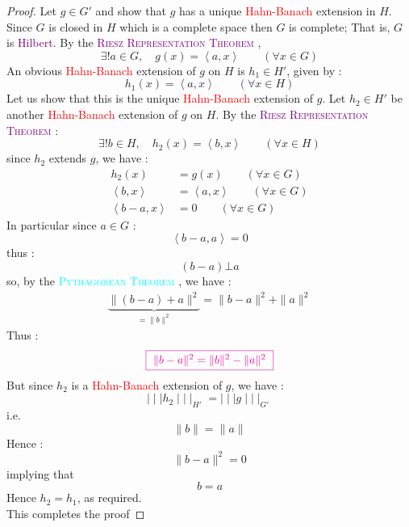 \begin{proof}
  Let $g \in  G'$ and show that $g $ has
  a unique \textcolor{red}{Hahn-Banach} extension in $H $.  
  Since $G$ is closed in $H $ which is a complete space  
  then $G $ is complete; That is, $G $ is \textcolor{purple}{Hilbert}.
  By the 
  \textcolor{purple}{
    \textsc{
  Riesz Representation Theorem 
    }
  }, 
  \[
  \exists ! a \in  G, \quad 
  g(x)  = \left\langle a,x \right\rangle   
  \quad \quad \left( \forall  x \in  G \right)
  \]
  An obvious \textcolor{red}{Hahn-Banach} extension of $g $ 
  on $H $ is $h_1 \in  H'$, given by :  
  \[
  h_1(x) = \left\langle 
    a, x
  \right\rangle   \quad \quad 
  \left( \forall  x \in  H \right)
  \]
  Let us show that this is the unique 
  \textcolor{red}{Hahn-Banach} extension of $g$. 
  Let $h_2 \in  H' $ be another \textcolor{red}{Hahn-Banach} 
  extension of $g $ on $H$. By the 
  \textcolor{purple}{
    \textsc{
  Riesz Representation Theorem 
    }
  } : 
  \[
  \exists ! b \in  H, \quad 
  h_2(x) = \left\langle 
    b,x
  \right\rangle \quad \quad (\forall  x \in  H) 
  \]
  since $h_2 $ extends $g $, we have :
  \begin{align*}
    h_2(x)  &= g(x)  \quad \quad (\forall  x \in  G)  
    \\
    \left\langle b,x \right\rangle  &=
    \left\langle a,x \right\rangle   \quad \quad 
    \left( \forall  x \in  G \right) 
    \\
    \left\langle b-a, x \right\rangle  &= 0  \quad \quad 
    \left( 
      \forall  x \in  G
    \right)
  \end{align*}
  In particular since $a \in G $ :  
  \[
  \left\langle 
    b-a, a
  \right\rangle  = 0
  \]
  thus : 
  \[
    (b-a)  \bot a
  \]
  so, by the 
  \textcolor{cyan}{
    \textsc{
      Pythagorean Theorem
    }
  }, we have : 
  \begin{align*}
    \underbrace{
  \| (b-a) + a  \| ^2  
    }_{= \| b \|^2  } 
  = 
  \| b-a \|  ^2  + 
  \| a \| ^2 
  \end{align*}
  Thus : 
  \[
    \textcolor{magenta}{
      \fbox{
        $\| b-a\|^2  = 
        \| b \|^2  - \| a \|^2$
      }
    }
  \]
  But since $h_2 $ is a \textcolor{red}{Hahn-Banach} extension 
  of $g $, we have : 
  \[
  \mid \mid \mid  h_2 \mid \mid \mid _{H'} = 
  \mid \mid \mid  g \mid \mid \mid _{G'}
  \]
  i.e. 
  \[
  \| b \| = \| a \| 
  \]
  Hence : 
  \[
  \| b-a \| ^2  = 0
  \]
  implying that 
  \[
    b = a
  \]
  Hence $h_2 = h_1$, as required. \\
  This completes the proof
\end{proof}


% 
